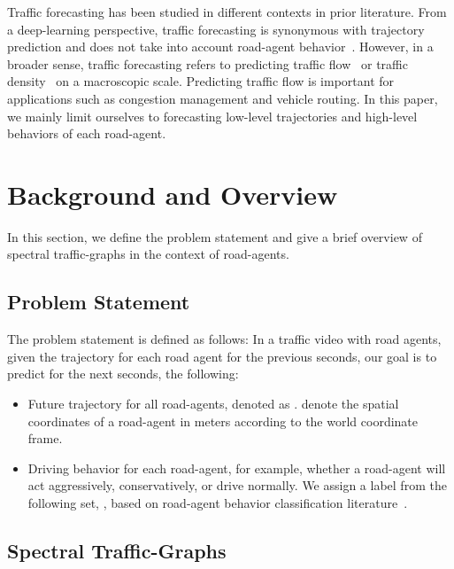 \documentclass[10pt,twocolumn,letterpaper]{article}
\theoremstyle{plain}
\begin{document}
Traffic forecasting has been studied in different contexts in prior literature. From a deep-learning perspective, traffic forecasting is synonymous with trajectory prediction and does not take into account road-agent behavior~\cite{Argoverse}. However, in a broader sense, traffic forecasting refers to predicting traffic flow~\cite{flow2,flow3,flow4} or traffic density~\cite{forecast1,forecast2,forecast3,forecast4} on a macroscopic scale. Predicting traffic flow is important for applications such as congestion management and vehicle routing. In this paper, we mainly limit ourselves to forecasting low-level trajectories and high-level behaviors of each road-agent.









 \section{Background and Overview}
In this section, we define the problem statement and give a brief overview of spectral traffic-graphs in the context of road-agents. 

\subsection{Problem Statement}
The problem statement is defined as follows: In a traffic video with  road agents, given the trajectory for each road agent for the previous  seconds, our goal is to predict for the next  seconds, the following:

\begin{itemize}[noitemsep]
    \item Future trajectory for all road-agents, denoted as .  denote the spatial coordinates of a road-agent in meters according to the world coordinate frame.
    \item Driving behavior for each road-agent, for example, whether a road-agent will act aggressively, conservatively, or drive normally. We assign a label from the following set, , based on road-agent behavior classification literature~\cite{ernestref15,ernestref16}.
\end{itemize}

\subsection{Spectral Traffic-Graphs}
\label{subsec: spectral graph theory}
\end{document}
